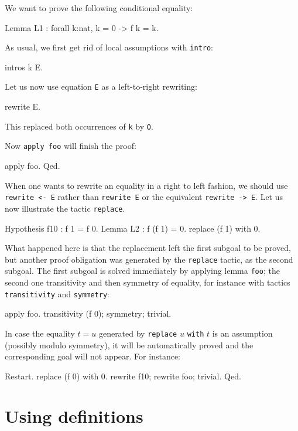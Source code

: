 \documentclass[11pt,a4paper]{book}
\begin{document}
We want to prove the following conditional equality:
\begin{coq_example*}
Lemma L1 : forall k:nat, k = 0 -> f k = k.
\end{coq_example*}

As usual, we first get rid of local assumptions with \verb:intro::
\begin{coq_example}
intros k E.
\end{coq_example}

Let us now use equation \verb:E: as a left-to-right rewriting:
\begin{coq_example}
rewrite E.
\end{coq_example}
This replaced both occurrences of \verb:k: by \verb:O:. 

Now \verb:apply foo: will finish the proof:

\begin{coq_example}
apply foo.
Qed.
\end{coq_example}

When one wants to rewrite an equality in a right to left fashion, we should
use \verb:rewrite <- E: rather than \verb:rewrite E: or the equivalent
\verb:rewrite -> E:. 
Let us now illustrate the tactic \verb:replace:.
\begin{coq_example}
Hypothesis f10 : f 1 = f 0.
Lemma L2 : f (f 1) = 0.
replace (f 1) with 0.
\end{coq_example}
What happened here is that the replacement left the first subgoal to be
proved, but another proof obligation was generated by the \verb:replace:
tactic, as the second subgoal. The first subgoal is solved immediately
by applying lemma \verb:foo:; the second one transitivity and then 
symmetry of equality, for instance with tactics \verb:transitivity: and 
\verb:symmetry::
\begin{coq_example}
apply foo.
transitivity (f 0); symmetry; trivial.
\end{coq_example}
In case the equality $t=u$ generated by \verb:replace: $u$ \verb:with:
$t$ is an assumption
(possibly modulo symmetry), it will be automatically proved and the
corresponding goal will not appear. For instance:
\begin{coq_example}
Restart.
replace (f 0) with 0.
rewrite f10; rewrite foo; trivial.
Qed.
\end{coq_example}

\section{Using definitions}
\end{document}
